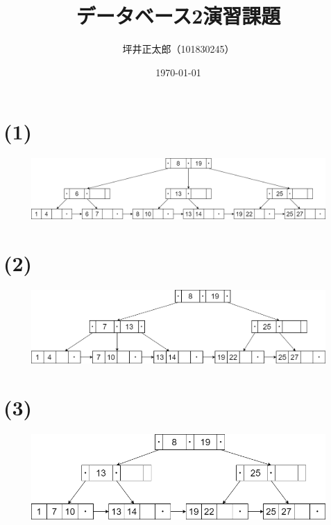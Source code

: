 \documentclass[a4paper,10pt]{jsarticle}
\begin{document}
\title{データベース2演習課題}
\author{坪井正太郎（101830245）}
\date{\today}
\maketitle
\section*{(1)}
\begin{figure}[H]
  \centering
  \includegraphics[width=\linewidth]{01.drawio.png}
\end{figure}

\section*{(2)}
\begin{figure}[H]
  \centering
  \includegraphics[width=\linewidth]{02.drawio.png}
\end{figure}

\section*{(3)}
\begin{figure}[H]
  \centering
  \includegraphics[width=\linewidth]{03.drawio.png}
\end{figure}
\end{document}
